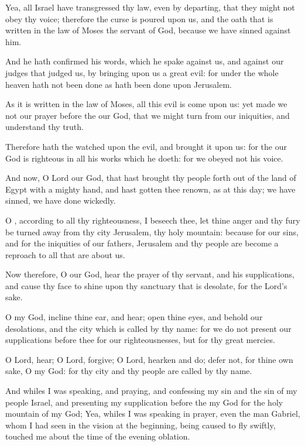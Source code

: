 \verse Yea, all Israel have transgressed thy law, even by departing, that they might not obey thy voice; therefore the curse is poured upon us, and the oath that is written in the law of Moses the servant of God, because we have sinned against him.

\verse And he hath confirmed his words, which he spake against us, and against our judges that judged us, by bringing upon us a great evil: for under the whole heaven hath not been done as hath been done upon Jerusalem.

\verse As it is written in the law of Moses, all this evil is come upon us: yet made we not our prayer before the \LORD our God, that we might turn from our iniquities, and understand thy truth.

\verse Therefore hath the \LORD watched upon the evil, and brought it upon us: for the \LORD our God is righteous in all his works which he doeth: for we obeyed not his voice.

\verse And now, O Lord our God, that hast brought thy people forth out of the land of Egypt with a mighty hand, and hast gotten thee renown, as at this day; we have sinned, we have done wickedly.

\verse O \LORD, according to all thy righteousness, I beseech thee, let thine anger and thy fury be turned away from thy city Jerusalem, thy holy mountain: because for our sins, and for the iniquities of our fathers, Jerusalem and thy people are become a reproach to all that are about us.

\verse Now therefore, O our God, hear the prayer of thy servant, and his supplications, and cause thy face to shine upon thy sanctuary that is desolate, for the Lord's sake.

\verse O my God, incline thine ear, and hear; open thine eyes, and behold our desolations, and the city which is called by thy name: for we do not present our supplications before thee for our righteousnesses, but for thy great mercies.

\verse O Lord, hear; O Lord, forgive; O Lord, hearken and do; defer not, for thine own sake, O my God: for thy city and thy people are called by thy name.

\verse And whiles I was speaking, and praying, and confessing my sin and the sin of my people Israel, and presenting my supplication before the \LORD my God for the holy mountain of my God; \verse Yea, whiles I was speaking in prayer, even the man Gabriel, whom I had seen in the vision at the beginning, being caused to fly swiftly, touched me about the time of the evening oblation.

